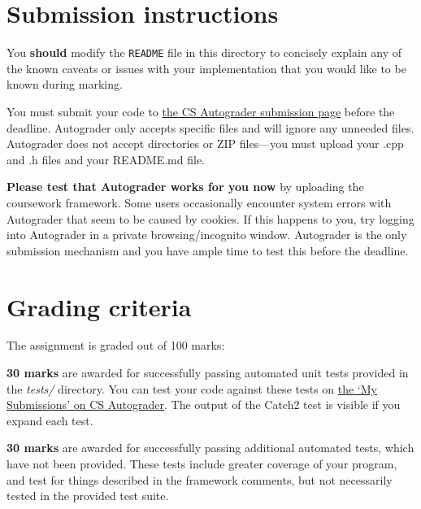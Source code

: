 \documentclass[a4paper]{article}
\newcommand\submissionlink{\href{https://csautograder.swansea.ac.uk/web/project/31}{the CS Autograder submission page}}
\newcommand\mysubmissionsurl{https://csautograder.swansea.ac.uk/web/project/31?current_tab=my_submissions}
\begin{document}
\newpage\section*{Submission instructions}
You \textbf{should} modify the \texttt{README} file in this directory to concisely explain any of the known caveats or issues with your implementation that you would like to be known during marking.

You must submit your code to \submissionlink{} before the deadline. Autograder only accepts specific files and will ignore any unneeded files. Autograder does not accept directories or ZIP files—you must upload your .cpp and .h files and your README.md file. 

\textbf{Please test that Autograder works for you now} by uploading the coursework framework. Some users occasionally encounter system errors with Autograder that seem to be caused by cookies. If this happens to you, try logging into Autograder in a private browsing/incognito window. Autograder is the only submission mechanism and you have ample time to test this before the deadline. 






\section*{Grading criteria}
The assignment is graded out of 100 marks:

\noindent{}\textbf{30 marks} are awarded for successfully passing automated unit tests provided in the \emph{tests/} directory. You can test your code against these tests on \href{\mysubmissionsurl}{the `My Submissions' on CS Autograder}. The output of the Catch2 test is visible if you expand each test.

\noindent{}\textbf{30 marks} are awarded for successfully passing additional automated tests, which have not been provided. These tests include greater coverage of your program, and test for things described in the framework comments, but not necessarily tested in the provided test suite.
\end{document}
